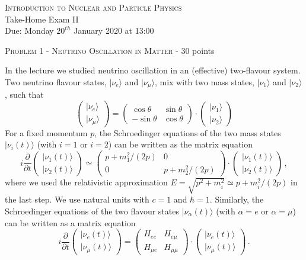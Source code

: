 \documentclass[a4paper,11pt]{report}
\begin{document}
\begin{center}
{\large \textsc{Introduction to Nuclear and Particle Physics}} \\[0.5cm]
\Large{Take-Home Exam II\\
Due: Monday $20^{th}$ January 2020 at 13:00}
\end{center}

{\large \textsc{Problem 1 - Neutrino Oscillation in Matter} - 30 points}

In the lecture we studied neutrino oscillation in an (effective) two-flavour system. Two neutrino flavour states, $|\nu_e\rangle$ and $|\nu_\mu\rangle$, mix with two mass states, $|\nu_1\rangle$ and $|\nu_2\rangle$, such that
\[
\begin{pmatrix}|\nu_e\rangle\\|\nu_\mu\rangle\end{pmatrix} = \begin{pmatrix}\cos\theta&\sin\theta\\-\sin\theta&\cos\theta\end{pmatrix}\cdot\begin{pmatrix}|\nu_1\rangle\\|\nu_2\rangle\end{pmatrix}
\]
For a fixed momentum $p$, the Schroedinger equations of the two mass states $|\nu_i(t)\rangle$ (with $i=1$ or $i=2$) can be written as the matrix equation
\begin{equation}\label{eq:ex1a}
i\frac{\partial}{\partial t}\begin{pmatrix}|\nu_1(t)\rangle\\|\nu_2(t)\rangle\end{pmatrix} \simeq \begin{pmatrix}p + {m_1^2}/(2p)&0\\0&p + {m_2^2}/(2p)\end{pmatrix}\cdot\begin{pmatrix}|\nu_1(t)\rangle\\|\nu_2(t)\rangle\end{pmatrix}\,,
\end{equation}
where we used the relativistic approximation $E=\sqrt{p^2+m_i^2} \simeq p+m_i^2/(2p)$ in the last step. We use natural units with $c=1$ and $\hbar=1$. Similarly, the Schroedinger equations of the two flavour states $|\nu_\alpha(t)\rangle$ (with $\alpha=e$ or $\alpha=\mu$) can be written as a matrix equation
\begin{equation}\label{eq:ex1b}
i\frac{\partial}{\partial t}\begin{pmatrix}|\nu_e(t)\rangle\\|\nu_\mu(t)\rangle\end{pmatrix} = \begin{pmatrix}H_{ee}&H_{e\mu}\\H_{\mu e}&H_{\mu\mu}\end{pmatrix}\cdot\begin{pmatrix}|\nu_e(t)\rangle\\|\nu_\mu(t)\rangle\end{pmatrix}\,.
\end{equation}
\end{document}
